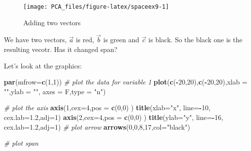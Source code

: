 \documentclass[
]{book}
\newenvironment{Shaded}{\begin{snugshade}}{\end{snugshade}}
\newcommand{\CommentTok}[1]{\textcolor[rgb]{0.56,0.35,0.01}{\textit{#1}}}
\newcommand{\DataTypeTok}[1]{\textcolor[rgb]{0.13,0.29,0.53}{#1}}
\newcommand{\DecValTok}[1]{\textcolor[rgb]{0.00,0.00,0.81}{#1}}
\newcommand{\FloatTok}[1]{\textcolor[rgb]{0.00,0.00,0.81}{#1}}
\newcommand{\KeywordTok}[1]{\textcolor[rgb]{0.13,0.29,0.53}{\textbf{#1}}}
\newcommand{\NormalTok}[1]{#1}
\newcommand{\OperatorTok}[1]{\textcolor[rgb]{0.81,0.36,0.00}{\textbf{#1}}}
\newcommand{\StringTok}[1]{\textcolor[rgb]{0.31,0.60,0.02}{#1}}
\theoremstyle{definition}
\theoremstyle{definition}
\theoremstyle{definition}
\theoremstyle{remark}
\begin{document}
\begin{figure}

{\centering \texttt{[image: PCA\_files/figure-latex/spaceex9-1]} 

}

\caption{Adding two vectors}\label{fig:spaceex9}
\end{figure}

We have two vectors, \(\vec{a}\) is red, \(\vec{b}\) is green and \(\vec{c}\) is black. So the black one is the resulting vecotr. Has it changed span?

Let's look at the graphics:

\begin{Shaded}
\begin{Highlighting}[]
\KeywordTok{par}\NormalTok{(}\DataTypeTok{mfrow=}\KeywordTok{c}\NormalTok{(}\DecValTok{1}\NormalTok{,}\DecValTok{1}\NormalTok{))}
\CommentTok{# plot the data for variable 1}
\KeywordTok{plot}\NormalTok{(}\KeywordTok{c}\NormalTok{(}\OperatorTok{-}\DecValTok{20}\NormalTok{,}\DecValTok{20}\NormalTok{),}\KeywordTok{c}\NormalTok{(}\OperatorTok{-}\DecValTok{20}\NormalTok{,}\DecValTok{20}\NormalTok{),}\DataTypeTok{xlab =} \StringTok{""}\NormalTok{,}\DataTypeTok{ylab =} \StringTok{""}\NormalTok{,}
 \DataTypeTok{axes =}\NormalTok{ F,}\DataTypeTok{type =} \StringTok{"n"}\NormalTok{)}

\CommentTok{# plot the axis}
\KeywordTok{axis}\NormalTok{(}\DecValTok{1}\NormalTok{,}\DataTypeTok{cex=}\DecValTok{4}\NormalTok{,}\DataTypeTok{pos =} \KeywordTok{c}\NormalTok{(}\DecValTok{0}\NormalTok{,}\DecValTok{0}\NormalTok{) )}
\KeywordTok{title}\NormalTok{(}\DataTypeTok{xlab=}\StringTok{"x"}\NormalTok{, }\DataTypeTok{line=}\OperatorTok{-}\DecValTok{10}\NormalTok{, }\DataTypeTok{cex.lab=}\FloatTok{1.2}\NormalTok{,}\DataTypeTok{adj=}\DecValTok{1}\NormalTok{)}
\KeywordTok{axis}\NormalTok{(}\DecValTok{2}\NormalTok{,}\DataTypeTok{cex=}\DecValTok{4}\NormalTok{,}\DataTypeTok{pos =} \KeywordTok{c}\NormalTok{(}\DecValTok{0}\NormalTok{,}\DecValTok{0}\NormalTok{) )}
\KeywordTok{title}\NormalTok{(}\DataTypeTok{ylab=}\StringTok{"y"}\NormalTok{, }\DataTypeTok{line=}\OperatorTok{-}\DecValTok{16}\NormalTok{, }\DataTypeTok{cex.lab=}\FloatTok{1.2}\NormalTok{,}\DataTypeTok{adj=}\DecValTok{1}\NormalTok{)}
\CommentTok{# plot arrow }
\KeywordTok{arrows}\NormalTok{(}\DecValTok{0}\NormalTok{,}\DecValTok{0}\NormalTok{,}\DecValTok{8}\NormalTok{,}\DecValTok{17}\NormalTok{,}\DataTypeTok{col=}\StringTok{"black"}\NormalTok{)}

\CommentTok{# plot span}


\end{Highlighting}
\end{Shaded}
\end{document}
